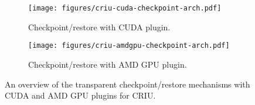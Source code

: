 \begin{figure*}[t]
    \centering
    \begin{subfigure}[b]{0.49\textwidth}
        \centering
        \texttt{[image: figures/criu-cuda-checkpoint-arch.pdf]}
        \caption{Checkpoint/restore with CUDA plugin.}
        \label{fig:criu-cuda-checkpoint-arch}
    \end{subfigure}
    \hspace{0.005em}
    \hspace{0.005em}
    \begin{subfigure}[b]{0.49\textwidth}
        \centering
        \texttt{[image: figures/criu-amdgpu-checkpoint-arch.pdf]}
        \caption{Checkpoint/restore with AMD GPU plugin.}
        \label{fig:criu-amdgpu-checkpoint-arch}
    \end{subfigure}
    \vspace{-0.5em}
    \caption{An overview of the transparent checkpoint/restore mechanisms with CUDA and AMD GPU plugins for CRIU.}
    \label{fig:criu-gpu-checkpoint-arch}
    \vspace{-1em}
\end{figure*}